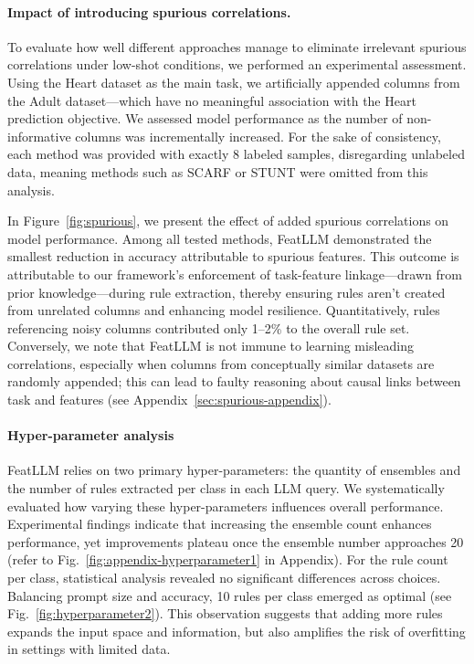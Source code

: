 \vspace*{-0.12in}
\paragraph{Impact of introducing spurious correlations.} To evaluate how well different approaches manage to eliminate irrelevant spurious correlations under low-shot conditions, we performed an experimental assessment. Using the Heart dataset as the main task, we artificially appended columns from the Adult dataset—which have no meaningful association with the Heart prediction objective. We assessed model performance as the number of non-informative columns was incrementally increased. For the sake of consistency, each method was provided with exactly 8 labeled samples, disregarding unlabeled data, meaning methods such as SCARF or STUNT were omitted from this analysis.

In Figure~\ref{fig:spurious}, we present the effect of added spurious correlations on model performance. Among all tested methods, \textsf{FeatLLM} demonstrated the smallest reduction in accuracy attributable to spurious features. This outcome is attributable to our framework’s enforcement of task-feature linkage—drawn from prior knowledge—during rule extraction, thereby ensuring rules aren’t created from unrelated columns and enhancing model resilience. Quantitatively, rules referencing noisy columns contributed only 1–2\% to the overall rule set. Conversely, we note that \textsf{FeatLLM} is not immune to learning misleading correlations, especially when columns from conceptually similar datasets are randomly appended; this can lead to faulty reasoning about causal links between task and features (see Appendix~\ref{sec:spurious-appendix}).

\vspace*{-0.12in}
\paragraph{Hyper-parameter analysis}
\textsf{FeatLLM} relies on two primary hyper-parameters: the quantity of ensembles and the number of rules extracted per class in each LLM query. We systematically evaluated how varying these hyper-parameters influences overall performance. Experimental findings indicate that increasing the ensemble count enhances performance, yet improvements plateau once the ensemble number approaches 20 (refer to Fig.~\ref{fig:appendix-hyperparameter1} in Appendix). For the rule count per class, statistical analysis revealed no significant differences across choices. Balancing prompt size and accuracy, 10 rules per class emerged as optimal (see Fig.~\ref{fig:hyperparameter2}). This observation suggests that adding more rules expands the input space and information, but also amplifies the risk of overfitting in settings with limited data.

